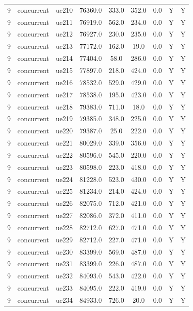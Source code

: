 \begin{table}[ht]
\begin{tabular}{|c|c|c|c|c|c|c|c|c|}
9 & concurrent & ue210 & 76360.0 & 333.0 & 352.0 & 0.0 & Y & Y \\
9 & concurrent & ue211 & 76919.0 & 562.0 & 234.0 & 0.0 & Y & Y \\
9 & concurrent & ue212 & 76927.0 & 230.0 & 235.0 & 0.0 & Y & Y \\
9 & concurrent & ue213 & 77172.0 & 162.0 & 19.0 & 0.0 & Y & Y \\
9 & concurrent & ue214 & 77404.0 & 58.0 & 286.0 & 0.0 & Y & Y \\
9 & concurrent & ue215 & 77897.0 & 218.0 & 424.0 & 0.0 & Y & Y \\
9 & concurrent & ue216 & 78532.0 & 529.0 & 429.0 & 0.0 & Y & Y \\
9 & concurrent & ue217 & 78538.0 & 195.0 & 423.0 & 0.0 & Y & Y \\
9 & concurrent & ue218 & 79383.0 & 711.0 & 18.0 & 0.0 & Y & Y \\
9 & concurrent & ue219 & 79385.0 & 348.0 & 225.0 & 0.0 & Y & Y \\
9 & concurrent & ue220 & 79387.0 & 25.0 & 222.0 & 0.0 & Y & Y \\
9 & concurrent & ue221 & 80029.0 & 339.0 & 356.0 & 0.0 & Y & Y \\
9 & concurrent & ue222 & 80596.0 & 545.0 & 220.0 & 0.0 & Y & Y \\
9 & concurrent & ue223 & 80598.0 & 223.0 & 418.0 & 0.0 & Y & Y \\
9 & concurrent & ue224 & 81228.0 & 523.0 & 430.0 & 0.0 & Y & Y \\
9 & concurrent & ue225 & 81234.0 & 214.0 & 424.0 & 0.0 & Y & Y \\
9 & concurrent & ue226 & 82075.0 & 712.0 & 421.0 & 0.0 & Y & Y \\
9 & concurrent & ue227 & 82086.0 & 372.0 & 411.0 & 0.0 & Y & Y \\
9 & concurrent & ue228 & 82712.0 & 627.0 & 471.0 & 0.0 & Y & Y \\
9 & concurrent & ue229 & 82712.0 & 227.0 & 471.0 & 0.0 & Y & Y \\
9 & concurrent & ue230 & 83399.0 & 569.0 & 487.0 & 0.0 & Y & Y \\
9 & concurrent & ue231 & 83399.0 & 226.0 & 487.0 & 0.0 & Y & Y \\
9 & concurrent & ue232 & 84093.0 & 543.0 & 422.0 & 0.0 & Y & Y \\
9 & concurrent & ue233 & 84095.0 & 222.0 & 419.0 & 0.0 & Y & Y \\
9 & concurrent & ue234 & 84933.0 & 726.0 & 20.0 & 0.0 & Y & Y \\

\end{tabular}
\end{table}
